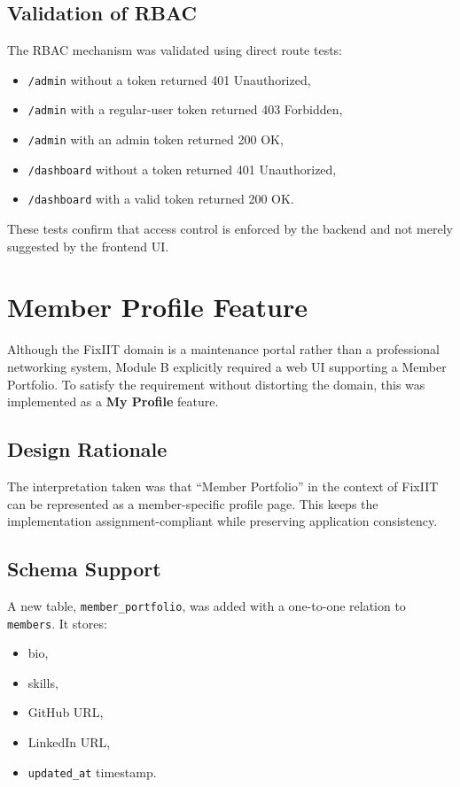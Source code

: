\documentclass[12pt,a4paper]{article}
\begin{document}
\subsection{Validation of RBAC}
The RBAC mechanism was validated using direct route tests:
\begin{itemize}[leftmargin=1.5em]
    \item \texttt{/admin} without a token returned 401 Unauthorized,
    \item \texttt{/admin} with a regular-user token returned 403 Forbidden,
    \item \texttt{/admin} with an admin token returned 200 OK,
    \item \texttt{/dashboard} without a token returned 401 Unauthorized,
    \item \texttt{/dashboard} with a valid token returned 200 OK.
\end{itemize}

These tests confirm that access control is enforced by the backend and not merely suggested by the frontend UI.

\section{Member Profile Feature}
Although the FixIIT domain is a maintenance portal rather than a professional networking system, Module B explicitly required a web UI supporting a Member Portfolio. To satisfy the requirement without distorting the domain, this was implemented as a \textbf{My Profile} feature.

\subsection{Design Rationale}
The interpretation taken was that ``Member Portfolio'' in the context of FixIIT can be represented as a member-specific profile page. This keeps the implementation assignment-compliant while preserving application consistency.

\subsection{Schema Support}
A new table, \texttt{member\_portfolio}, was added with a one-to-one relation to \texttt{members}. It stores:
\begin{itemize}[leftmargin=1.5em]
    \item bio,
    \item skills,
    \item GitHub URL,
    \item LinkedIn URL,
    \item \texttt{updated\_at} timestamp.
\end{itemize}
\end{document}
